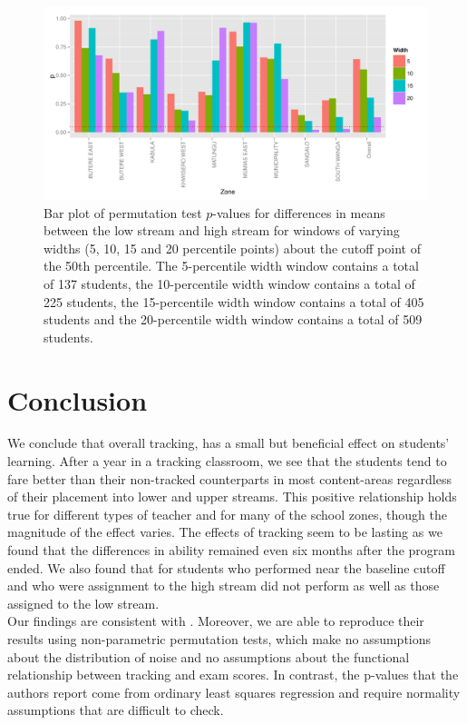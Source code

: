 \documentclass[11pt]{article}
\begin{document}
  \begin{figure}[H]
 \centering
 \includegraphics[scale=0.6]{RD_pval.pdf}
 \caption{Bar plot of permutation test $p$-values for differences in means between the low stream and high stream for windows of varying widths (5, 10, 15 and 20 percentile points) about the cutoff point of the 50th percentile. The 5-percentile width window contains a total of 137 students, the 10-percentile width window contains a total of 225 students, the 15-percentile width window contains a total of 405 students and the 20-percentile width window contains a total of 509 students.}
 \label{fig:pval_window}
 \end{figure}
 
 
 
 
 
 
\section{Conclusion}
We conclude that overall tracking, has a small but beneficial effect on students' learning.  After a year in a tracking classroom, we see that the students tend to fare better than their non-tracked counterparts in most content-areas regardless of their placement into lower and upper streams.  This positive relationship holds true for different types of teacher and for many of the school zones, though the magnitude of the effect varies.  The effects of tracking seem to be lasting as we found that the differences in ability remained even six months after the program ended. We also found that for students who performed near the baseline cutoff and who were assignment to the high stream did not perform as well as those assigned to the low stream. \\

Our findings are consistent with \cite{duflo2011}. Moreover, we are able to reproduce their results using non-parametric permutation tests, which make no assumptions about the distribution of noise and no assumptions about the functional relationship between tracking and exam scores. In contrast, the p-values that the authors report come from ordinary least squares regression and require normality assumptions that are difficult to check.



 
\end{document}
